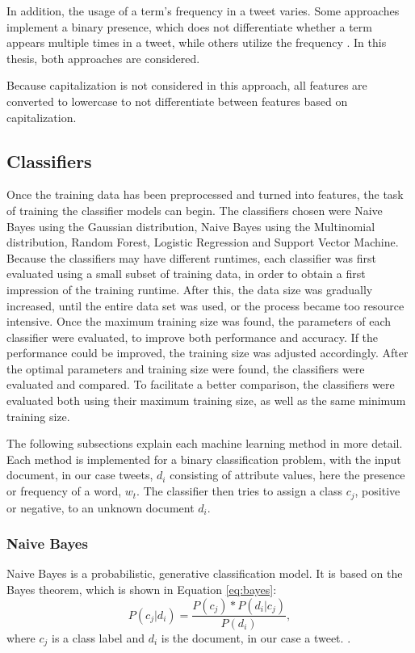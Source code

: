 In addition, the usage of a term's frequency in a tweet varies. Some approaches implement a binary presence, which does not differentiate whether a term appears multiple times in a tweet, while others utilize the frequency \cite{DBLP:journals/csur/GiachanouC16}. In this thesis, both approaches are considered.

Because capitalization is not considered in this approach, all features are converted to lowercase to not differentiate between features based on capitalization.

\subsection{Classifiers}
\label{sub:classifiers}

Once the training data has been preprocessed and turned into features, the task of training the classifier models can begin. The classifiers chosen were Naive Bayes using the Gaussian distribution, Naive Bayes using the Multinomial distribution, Random Forest, Logistic Regression and Support Vector Machine. Because the classifiers may have different runtimes, each classifier was first evaluated using a small subset of training data, in order to obtain a first impression of the training runtime. After this, the data size was gradually increased, until the entire data set was used, or the process became too resource intensive. Once the maximum training size was found, the parameters of each classifier were evaluated, to improve both performance and accuracy. If the performance could be improved, the training size was adjusted accordingly. After the optimal parameters and training size were found, the classifiers were evaluated and compared. To facilitate a better comparison, the classifiers were evaluated both using their maximum training size, as well as the same minimum training size.

The following subsections explain each machine learning method in more detail. Each method is implemented for a binary classification problem, with the input document, in our case tweets, $d_i$ consisting of attribute values, here the presence or frequency of a word, $w_t$. The classifier then tries to assign a class $c_j$, positive or negative, to an unknown document $d_i$.

    \subsubsection{Naive Bayes}
    \label{sub:nb}
        Naive Bayes is a probabilistic, generative classification model. It is based on the Bayes theorem, which is shown in Equation \eqref{eq:bayes}:
        \begin{equation}
            \label{eq:bayes}
            P(c_j|d_i) = \frac{P(c_j) * P(d_i|c_j)}{P(d_i)},
        \end{equation}
        where $c_j$ is a class label and $d_i$ is the document, in our case a tweet. \cite{DBLP:books/aw/TanSKK2019}. 
        
